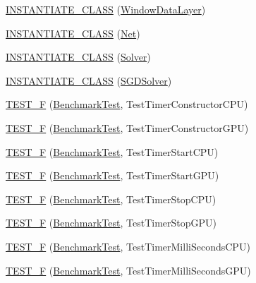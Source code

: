 \begin{DoxyCompactItemize}
\hyperlink{namespacecaffe_a2f03ba694679a26b9e565f9ca2bc02ca}{I\+N\+S\+T\+A\+N\+T\+I\+A\+T\+E\+\_\+\+C\+L\+A\+S\+S} (\hyperlink{classcaffe_1_1_window_data_layer}{Window\+Data\+Layer})
\item 
\hyperlink{namespacecaffe_af8030f9a1ee4f018561a42359c365da9}{I\+N\+S\+T\+A\+N\+T\+I\+A\+T\+E\+\_\+\+C\+L\+A\+S\+S} (\hyperlink{classcaffe_1_1_net}{Net})
\item 
\hyperlink{namespacecaffe_a76fd1ebc28ae6ed213991bcfbbc2d25c}{I\+N\+S\+T\+A\+N\+T\+I\+A\+T\+E\+\_\+\+C\+L\+A\+S\+S} (\hyperlink{classcaffe_1_1_solver}{Solver})
\item 
\hyperlink{namespacecaffe_ab49a0e695d3ff3f6774083c4ed6fe9a3}{I\+N\+S\+T\+A\+N\+T\+I\+A\+T\+E\+\_\+\+C\+L\+A\+S\+S} (\hyperlink{classcaffe_1_1_s_g_d_solver}{S\+G\+D\+Solver})
\item 
\hyperlink{namespacecaffe_aa161d9216abadf10691699a874583092}{T\+E\+S\+T\+\_\+\+F} (\hyperlink{classcaffe_1_1_benchmark_test}{Benchmark\+Test}, Test\+Timer\+Constructor\+C\+P\+U)
\item 
\hyperlink{namespacecaffe_ac409ceb8e42b251d3dccbe4ba31e0b29}{T\+E\+S\+T\+\_\+\+F} (\hyperlink{classcaffe_1_1_benchmark_test}{Benchmark\+Test}, Test\+Timer\+Constructor\+G\+P\+U)
\item 
\hyperlink{namespacecaffe_abd6d805be61e4ea684b81737936a5e81}{T\+E\+S\+T\+\_\+\+F} (\hyperlink{classcaffe_1_1_benchmark_test}{Benchmark\+Test}, Test\+Timer\+Start\+C\+P\+U)
\item 
\hyperlink{namespacecaffe_acc2ffc39313e09353d9ed6296e74defd}{T\+E\+S\+T\+\_\+\+F} (\hyperlink{classcaffe_1_1_benchmark_test}{Benchmark\+Test}, Test\+Timer\+Start\+G\+P\+U)
\item 
\hyperlink{namespacecaffe_ae327137234aa5ea8c6527dad1fe16461}{T\+E\+S\+T\+\_\+\+F} (\hyperlink{classcaffe_1_1_benchmark_test}{Benchmark\+Test}, Test\+Timer\+Stop\+C\+P\+U)
\item 
\hyperlink{namespacecaffe_ae7049af66705d73bbf9a9f118a178380}{T\+E\+S\+T\+\_\+\+F} (\hyperlink{classcaffe_1_1_benchmark_test}{Benchmark\+Test}, Test\+Timer\+Stop\+G\+P\+U)
\item 
\hyperlink{namespacecaffe_a625d020fc1a7a6cb533e3a9e96ed38f8}{T\+E\+S\+T\+\_\+\+F} (\hyperlink{classcaffe_1_1_benchmark_test}{Benchmark\+Test}, Test\+Timer\+Milli\+Seconds\+C\+P\+U)
\item 
\hyperlink{namespacecaffe_ae902f5031d57a26d47055d7a9d222baa}{T\+E\+S\+T\+\_\+\+F} (\hyperlink{classcaffe_1_1_benchmark_test}{Benchmark\+Test}, Test\+Timer\+Milli\+Seconds\+G\+P\+U)
\item 

\end{DoxyCompactItemize}
